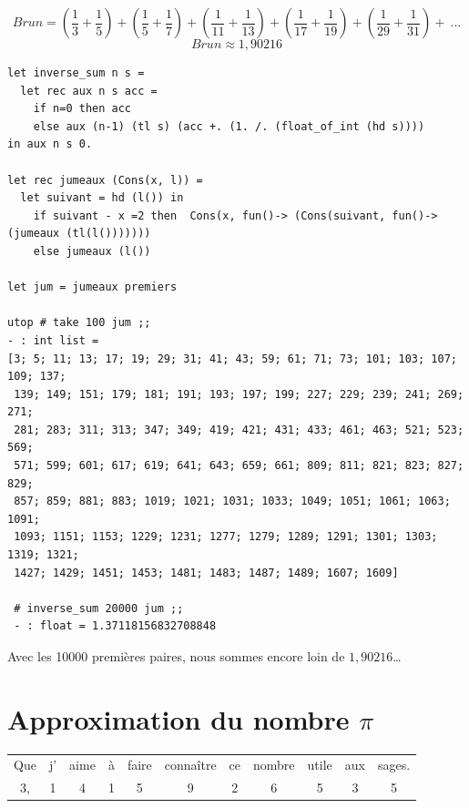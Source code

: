 \documentclass[11pt]{book}
\begin{document}
\[ Brun = (\frac{1}{3} + \frac{1}{5}) + (\frac{1}{5} + \frac{1}{7}) + (\frac{1}{11} + \frac{1}{13}) + (\frac{1}{17} + \frac{1}{19}) + (\frac{1}{29} + \frac{1}{31}) +\  ... \]
\[ Brun \approx 1,90216 \]

\begin{Verbatim}
let inverse_sum n s = 
  let rec aux n s acc =
 	if n=0 then acc
	else aux (n-1) (tl s) (acc +. (1. /. (float_of_int (hd s))))
in aux n s 0. 

let rec jumeaux (Cons(x, l)) =
  let suivant = hd (l()) in
    if suivant - x =2 then  Cons(x, fun()-> (Cons(suivant, fun()-> (jumeaux (tl(l()))))))
    else jumeaux (l()) 

let jum = jumeaux premiers 

utop # take 100 jum ;;
- : int list =
[3; 5; 11; 13; 17; 19; 29; 31; 41; 43; 59; 61; 71; 73; 101; 103; 107; 109; 137;
 139; 149; 151; 179; 181; 191; 193; 197; 199; 227; 229; 239; 241; 269; 271;
 281; 283; 311; 313; 347; 349; 419; 421; 431; 433; 461; 463; 521; 523; 569;
 571; 599; 601; 617; 619; 641; 643; 659; 661; 809; 811; 821; 823; 827; 829;
 857; 859; 881; 883; 1019; 1021; 1031; 1033; 1049; 1051; 1061; 1063; 1091;
 1093; 1151; 1153; 1229; 1231; 1277; 1279; 1289; 1291; 1301; 1303; 1319; 1321;
 1427; 1429; 1451; 1453; 1481; 1483; 1487; 1489; 1607; 1609]
 
 # inverse_sum 20000 jum ;;
 - : float = 1.37118156832708848
 \end{Verbatim}
 Avec les 10000 premières paires, nous sommes encore loin de $1,90216$\dots
\section{Approximation du nombre $\pi$ }

\begin{center}
	\begin{tabular}{ccccccccccc}
		Que & j'& aime & à & faire & connaître & ce & nombre & utile & aux & sages. \\
		3,   & 1 &  4   & 1 &  5    &  9        & 2  &  6     &  5    & 3   & 5 \\ 
	\end{tabular}	
\end{center}
\end{document}
